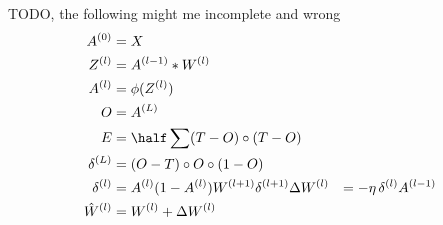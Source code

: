 TODO, the following might me incomplete and wrong
\begin{align}
A^{(0)} &= X\\
Z^{(l)} &= A^{(l-1)} * W^{(l)}\\
A^{(l)} &= \phi(Z^{(l)})\\
O &= A^{(L)}\\
E &= \half \sum (T - O) \circ (T - O)\\
\delta^{(L)} &= (O - T) \circ O \circ (1 - O)\\
\delta^{(l)} &= A^{(l)} (1 - A^{(l)}) W^{(l+1)} \delta^{(l+1)}
\Delta W^{(l)} &= - \eta\, \delta^{(l)} A^{(l-1)}\\
\hat W^{(l)} &= W^{(l)} + \Delta W^{(l)}
\end{align}
